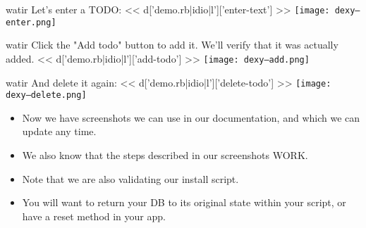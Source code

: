 \documentclass{beamer}
\begin{document}
\begin{frame}[fragile]{watir}
\normalsize
Let's enter a TODO:
\scriptsize
<< d['demo.rb|idio|l']['enter-text'] >>
\texttt{[image: dexy--enter.png]}
\end{frame}

\begin{frame}[fragile]{watir}
Click the "Add todo" button to add it. We'll verify that it was actually added.
\scriptsize
<< d['demo.rb|idio|l']['add-todo'] >>
\texttt{[image: dexy--add.png]}
\end{frame}

\begin{frame}[fragile]{watir}
\normalsize
And delete it again:
\scriptsize
<< d['demo.rb|idio|l']['delete-todo'] >>
\texttt{[image: dexy--delete.png]}
\end{frame}

\begin{frame}{}
\begin{itemize}
\item{Now we have screenshots we can use in our documentation, and which we can update any time.}
\item{We also know that the steps described in our screenshots WORK.}
\item{Note that we are also validating our install script.}
\item{You will want to return your DB to its original state within your script, or have a reset method in your app.}
\end{itemize}
\end{frame}
\end{document}
